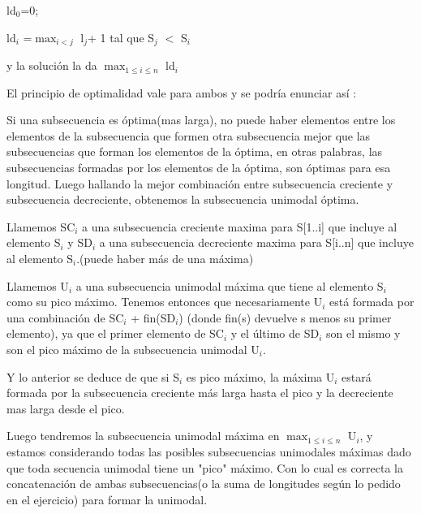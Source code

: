 ld$_0$=0;

ld$_i$ =$\max_{i<j}$ l$_j$+ 1  tal que S$_j$ $<$ S$_i$ 

y la solución la da $\max_{1\leq i\leq n}$ ld$_i$


El principio de optimalidad vale para ambos y se podría enunciar así : 

Si una subsecuencia es óptima(mas larga), no puede haber elementos entre los elementos de la subsecuencia que formen otra subsecuencia mejor que las subsecuencias que forman los elementos de la óptima, en otras palabras, las subsecuencias formadas por los elementos de la óptima, son óptimas para esa longitud.
Luego hallando la mejor combinación entre subsecuencia creciente y subsecuencia decreciente, obtenemos la subsecuencia unimodal óptima. 


Llamemos SC${_i}$ a una subsecuencia creciente maxima para S[1..i] que incluye al elemento S$_i$ y SD${_i}$ a una subsecuencia decreciente maxima para S[i..n] que incluye al elemento S${_i}$.(puede haber más de una máxima)

Llamemos U${_i}$ a una subsecuencia unimodal máxima que tiene al elemento S${_i}$ como su pico máximo.
Tenemos entonces que necesariamente U${_i}$ está formada por una combinación de SC${_i}$ + fin(SD${_i}$) (donde fin(s) devuelve s menos su primer elemento), ya que el primer elemento de SC${_i}$ y el último de SD${_i}$ son el mismo y son el pico máximo de la subsecuencia unimodal U${_i}$.

Y lo anterior se deduce de que si S{$_i$} es pico máximo, la máxima U${_i}$ estará formada por la subsecuencia creciente más larga hasta el pico y la decreciente mas larga desde el pico. 

Luego tendremos la subsecuencia unimodal máxima en $\max_{1\leq i\leq n}$ U${_i}$, y estamos considerando todas las posibles subsecuencias unimodales máximas dado que toda secuencia unimodal tiene un "pico" máximo.
Con lo cual es correcta la concatenación de ambas subsecuencias(o la suma de longitudes según lo pedido en el ejercicio) para formar la unimodal. 

